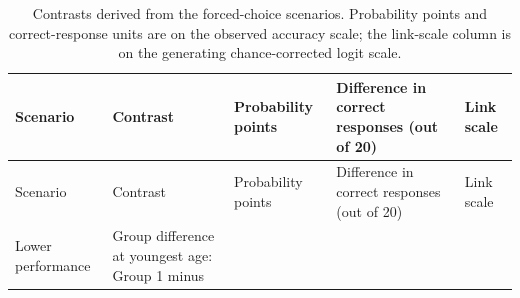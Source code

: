 \documentclass[
  man,
  floatsintext,
  longtable,
  nolmodern,
  notxfonts,
  notimes,
  colorlinks=true,linkcolor=blue,citecolor=blue,urlcolor=blue]{apa7}
\begin{document}
\begin{longtable}[]{@{}
  >{\raggedright\arraybackslash}p{}
  >{\raggedright\arraybackslash}p{}
  >{\raggedright\arraybackslash}p{}
  >{\raggedright\arraybackslash}p{}
  >{\raggedright\arraybackslash}p{}@{}}
\caption{Contrasts derived from the forced-choice scenarios. Probability
points and correct-response units are on the observed accuracy scale;
the link-scale column is on the generating chance-corrected logit
scale.}\label{tbl-contrasts-forced-choice}\tabularnewline
\toprule\noalign{}
\begin{minipage}[b]{\linewidth}\raggedright
Scenario
\end{minipage} & \begin{minipage}[b]{\linewidth}\raggedright
Contrast
\end{minipage} & \begin{minipage}[b]{\linewidth}\raggedright
Probability points
\end{minipage} & \begin{minipage}[b]{\linewidth}\raggedright
Difference in correct responses (out of 20)
\end{minipage} & \begin{minipage}[b]{\linewidth}\raggedright
Link scale
\end{minipage} \\
\midrule\noalign{}
\endfirsthead
\toprule\noalign{}
\begin{minipage}[b]{\linewidth}\raggedright
Scenario
\end{minipage} & \begin{minipage}[b]{\linewidth}\raggedright
Contrast
\end{minipage} & \begin{minipage}[b]{\linewidth}\raggedright
Probability points
\end{minipage} & \begin{minipage}[b]{\linewidth}\raggedright
Difference in correct responses (out of 20)
\end{minipage} & \begin{minipage}[b]{\linewidth}\raggedright
Link scale
\end{minipage} \\
\midrule\noalign{}
\endhead
\bottomrule\noalign{}
\endlastfoot
Lower performance & Group difference at youngest age: Group 1 minus

\end{longtable}
\end{document}
